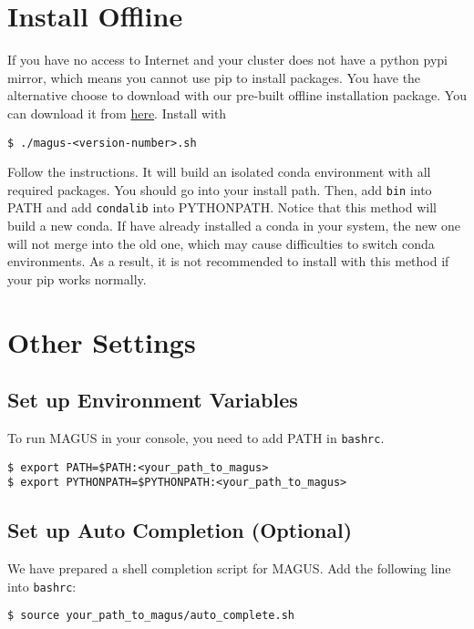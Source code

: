 \documentclass[12pt,oneside]{book}
\newcommand{\file}[1]{\texttt{#1}}
\newcommand{\chref}[3][blue]{\textcolor{#1}{\href{#2}{#3}}} %
\begin{document}
\section{Install Offline}
If you have no access to Internet and your cluster does not have a python pypi mirror, which means you cannot use pip to install packages. You have the alternative choose to download with our pre-built offline installation package. You can download it from \chref{https://gitlab.com/bigd4/magus/-/releases/}{here}. Install with 
\begin{tcolorbox}
    \begin{verbatim}
$ ./magus-<version-number>.sh
    \end{verbatim}
\end{tcolorbox}
Follow the instructions. It will build an isolated conda environment with all required packages. You should go into your install path. Then, add \file{bin} into PATH and add \file{condalib} into PYTHONPATH. Notice that this method will build a new conda. If have  already installed a conda in your system, the new one will not merge into the old one, which may cause difficulties to switch conda environments. As a result, it is not recommended to install with this method if your pip works normally.

\section{Other Settings}
\subsection{Set up Environment Variables}
To run MAGUS in your console, you need to add PATH in \file{bashrc}.
\begin{tcolorbox}
    \begin{verbatim}
$ export PATH=$PATH:<your_path_to_magus>
$ export PYTHONPATH=$PYTHONPATH:<your_path_to_magus>
    \end{verbatim}
\end{tcolorbox}


\subsection{Set up Auto Completion (Optional)}
We have prepared a shell completion script for MAGUS. Add the following line into \file{bashrc}:
\begin{tcolorbox}
    \begin{verbatim}
$ source your_path_to_magus/auto_complete.sh
    \end{verbatim}
\end{tcolorbox}
\end{document}
